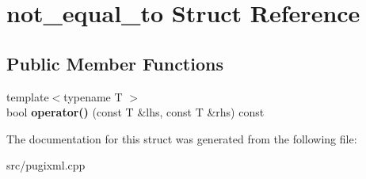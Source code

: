 \hypertarget{structnot__equal__to}{}\section{not\+\_\+equal\+\_\+to Struct Reference}
\label{structnot__equal__to}
\subsection*{Public Member Functions}
\begin{DoxyCompactItemize}
\item 
\mbox{\label{structnot__equal__to_ab47f9ee4aea1fefab4250ca11ef4e388}} 
{\footnotesize template$<$typename T $>$ }\\bool {\bfseries operator()} (const T \&lhs, const T \&rhs) const
\end{DoxyCompactItemize}


The documentation for this struct was generated from the following file\+:\begin{DoxyCompactItemize}
\item 
src/pugixml.\+cpp\end{DoxyCompactItemize}

